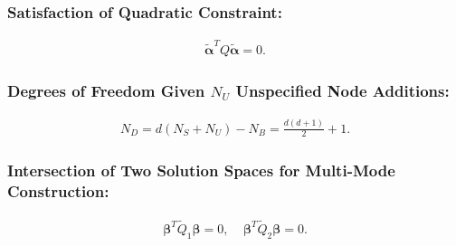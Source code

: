 \documentclass[%
preprint,
 amsmath,amssymb,
 aps,
]{revtex4-1}
\begin{document}
\subsubsection{Satisfaction of Quadratic Constraint:}
\begin{align}
\label{eq:quadric}
\bm{\tilde{\alpha}}^T
Q
\bm{\tilde{\alpha}} = 0.
\end{align}

\subsubsection{Degrees of Freedom Given $N_U$ Unspecified Node Additions:}
\begin{align}
\label{eq:dof_bipartite}
N_D = d(N_S + N_U) - N_B = \frac{d(d+1)}{2}+1.
\end{align}

\subsubsection{Intersection of Two Solution Spaces for Multi-Mode Construction:}
\begin{align}
\label{eq:basis}
\bm{\beta}^T \tilde{Q}_1 \bm{\beta} = 0,~~~~~\bm{\beta}^T \tilde{Q}_2 \bm{\beta} = 0.
\end{align}
\end{document}
